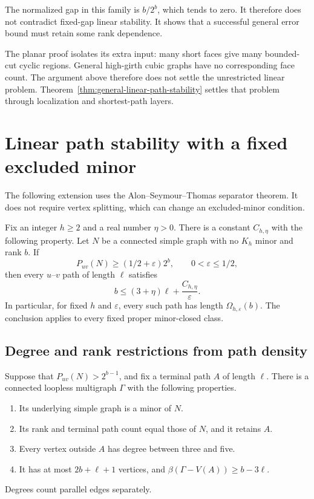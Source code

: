 The normalized gap in this family is $b/2^b$, which tends to zero.
It therefore does not contradict fixed-gap linear stability.
It shows that a successful general error bound must retain some rank dependence.

The planar proof isolates its extra input: many short faces give many bounded-cut cyclic regions.
General high-girth cubic graphs have no corresponding face count.
The argument above therefore does not settle the unrestricted linear problem.
Theorem~\ref{thm:general-linear-path-stability} settles that problem through localization and shortest-path layers.

\section{Linear path stability with a fixed excluded minor}
\label{sec:path-minor-stability}

The following extension uses the Alon--Seymour--Thomas separator theorem.
It does not require vertex splitting, which can change an excluded-minor condition.

\begin{theorem}\label{thm:path-excluded-minor}
Fix an integer $h\ge2$ and a real number $\eta>0$.
There is a constant $C_{h,\eta}$ with the following property.
Let $N$ be a connected simple graph with no $K_h$ minor and rank $b$.
If
\[
 P_{uv}(N)\ge(1/2+\varepsilon)2^b,
 \qquad 0<\varepsilon\le1/2,
\]
then every $u$--$v$ path of length $\ell$ satisfies
\begin{equation}\label{eq:path-minor-linear}
 b\le(3+\eta)\ell+\frac{C_{h,\eta}}{\varepsilon}.
\end{equation}
In particular, for fixed $h$ and $\varepsilon$, every such path has length $\Omega_{h,\varepsilon}(b)$.
The conclusion applies to every fixed proper minor-closed class.
\end{theorem}

\subsection{Degree and rank restrictions from path density}

\begin{lemma}\label{lem:path-route-reduction}
Suppose that $P_{uv}(N)>2^{b-1}$, and fix a terminal path $A$ of length $\ell$.
There is a connected loopless multigraph $\Gamma$ with the following properties.
\begin{enumerate}
\item Its underlying simple graph is a minor of $N$.
\item Its rank and terminal path count equal those of $N$, and it retains $A$.
\item Every vertex outside $A$ has degree between three and five.
\item It has at most $2b+\ell+1$ vertices, and $\beta(\Gamma-V(A))\ge b-3\ell$.
\end{enumerate}
Degrees count parallel edges separately.
\end{lemma}


